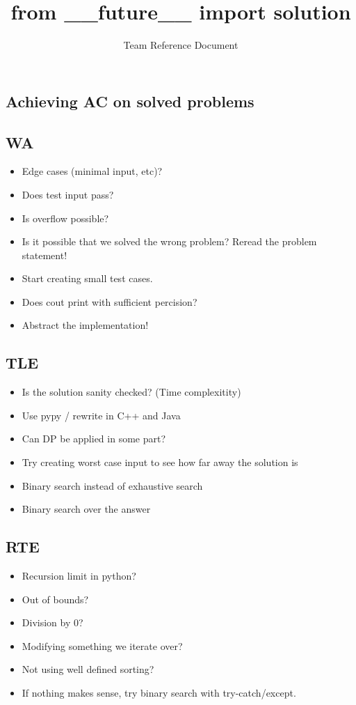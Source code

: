 \documentclass[8pt,a4paper,landscape,oneside]{amsart}
\title{from \_\_future\_\_ import solution}
\subtitle{Team Reference Document}
\author{}
\date{\ddmmyyyydate{\today{}}}
\begin{document}
\begin{multicols*}{2}
\maketitle
\thispagestyle{fancy}
\vspace{-3em}

\tableofcontents
\begin{large}
\section{Achieving AC on solved problems}
\subsection{WA}
\begin{itemize}
    \item Edge cases (minimal input, etc)? 
    \item Does test input pass?
    \item Is overflow possible?
    \item Is it possible that we solved the wrong problem? Reread the problem statement!
    \item Start creating small test cases.
    \item Does cout print with sufficient percision?
    \item Abstract the implementation!
\end{itemize}
\subsection{TLE}
\begin{itemize}
    \item Is the solution sanity checked? (Time complexitity)
    \item Use pypy / rewrite in C++ and Java
    \item Can DP be applied in some part?
    \item Try creating worst case input to see how far away the solution is
    \item Binary search instead of exhaustive search
    \item Binary search over the answer
\end{itemize}
\subsection{RTE}
\begin{itemize}
    \item Recursion limit in python?
    \item Out of bounds?
    \item Division by 0?
    \item Modifying something we iterate over?
    \item Not using well defined sorting?
    \item If nothing makes sense, try binary search with try-catch/except.
\end{itemize}

\end{large}
\end{multicols*}
\end{document}
